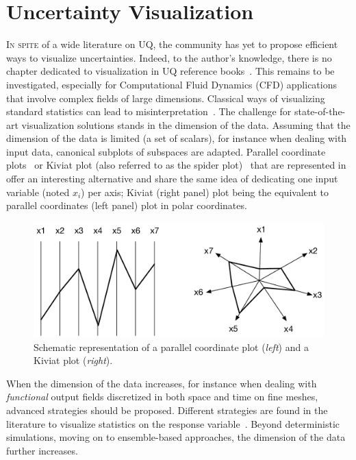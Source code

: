 \section{Uncertainty Visualization}\label{sec:visu}
\lettrine{I}{n spite} of a wide literature on UQ, the community has yet to propose efficient ways to visualize uncertainties. Indeed, to the author's knowledge, there is no chapter dedicated to visualization in UQ reference books~\citep{Saltelli2007,sullivan2015,handbookUQ}. This remains to be investigated, especially for Computational Fluid Dynamics (CFD) applications~\citep{Moreland2016} that involve complex fields of large dimensions. Classical ways of visualizing standard statistics can lead to misinterpretation~\citep{Anscombe1973}. The challenge for state-of-the-art visualization solutions stands in the dimension of the data. Assuming that the dimension of the data is limited (a set of scalars), for instance when dealing with input data, canonical subplots of subspaces are adapted. Parallel coordinate plots~\citep{Inselberg1985} or Kiviat plot (also referred to as the spider plot)~\citep{Hackstadt1994} that are represented in~ offer an interesting alternative and share the same idea of dedicating one input variable (noted $x_i$) per axis; Kiviat (right panel) plot being the equivalent to parallel coordinates (left panel) plot in polar coordinates. 
\begin{figure}[!ht]
\centering
\includegraphics[width=0.9\linewidth,keepaspectratio]{fig/literature/parallel-kiviat.pdf}
\caption{Schematic representation of a parallel coordinate plot (\emph{left}) and a Kiviat plot (\emph{right}).}
\label{fig:sketch_Kiviat-parallel}
\end{figure}

When the dimension of the data increases, for instance when dealing with \emph{functional} output fields discretized in both space and time on fine meshes, advanced strategies should be proposed. Different strategies are found in the literature to visualize statistics on the response variable~\citep{Potter2012a,Brodlie2012,Bonneau2014}. Beyond deterministic simulations, moving on to ensemble-based approaches, the dimension of the data further increases.

